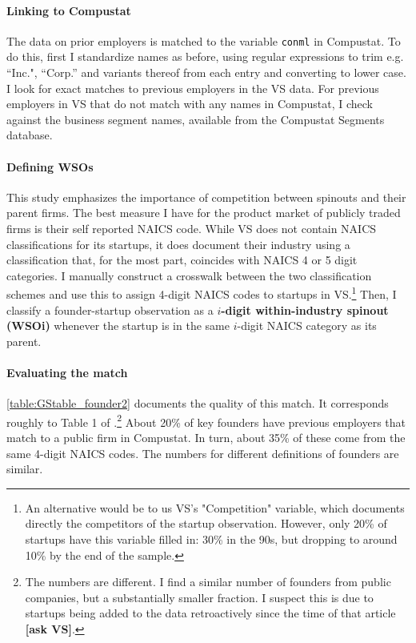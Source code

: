 \documentclass[11pt,english]{article}
\theoremstyle{remark}
\begin{document}


\paragraph{Linking to Compustat}

The data on prior employers is matched to the variable \texttt{conml} in Compustat. To do this, first I standardize names as before, using regular expressions to trim e.g. ``Inc.", ``Corp.'' and variants thereof from each entry and converting to lower case. I look for exact matches to previous employers in the VS data. For previous employers in VS that do not match with any names in Compustat, I check against the business segment names, available from the Compustat Segments database. 

\paragraph{Defining WSOs}

This study emphasizes the importance of competition between spinouts and their parent firms. The best measure I have for the product market of publicly traded firms is their self reported NAICS code. While VS does not contain NAICS classifications for its startups, it does document their industry using a classification that, for the most part, coincides with NAICS 4 or 5 digit categories. I manually construct a crosswalk between the two classification schemes and use this to assign 4-digit NAICS codes to startups in VS.\footnote{An alternative would be to us VS's "Competition" variable, which documents directly the competitors of the startup observation. However, only 20\% of startups have this variable filled in: 30\% in the 90s, but dropping to around 10\% by the end of the sample.} Then, I classify a founder-startup observation as a \textbf{$i$-digit within-industry spinout (WSOi)} whenever the startup is in the same $i$-digit NAICS category as its parent. 

\paragraph{Evaluating the match}

\autoref{table:GStable_founder2} documents the quality of this match. It corresponds roughly to Table 1 of \cite{gompers_entrepreneurial_2005}.\footnote{The numbers are different. I find a similar number of founders from public companies, but a substantially smaller fraction. I suspect this is due to startups being added to the data retroactively since the time of that article \textbf{[ask VS]}.} About 20\% of key founders have previous employers that match to a public firm in Compustat. In turn, about 35\% of these come from the same 4-digit NAICS codes. The numbers for different definitions of founders are similar. 
\end{document}

